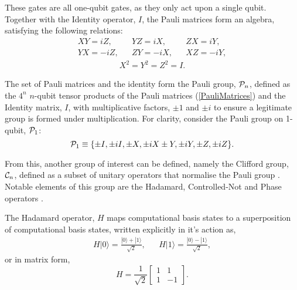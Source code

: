 These gates are all one-qubit gates, as they only act upon a single qubit.
Together with the Identity operator, $I$, the Pauli matrices form an algebra,
satisfying the following relations:
\begin{align}
    XY = iZ,  &  & YZ = iX,  &  & ZX = iY,  \\
    YX = -iZ, &  & ZY = -iX, &  & XZ = -iY,
\end{align}
\begin{align}
    X^2 = Y^2 = Z^2 = I.
\end{align}


The set of Pauli matrices and the identity form
the Pauli group, ${\cal P}_n$, defined as the $4^n$ $n$-qubit tensor products of the Pauli matrices (\ref{PauliMatrices}) and the
Identity matrix, $I$, with multiplicative factors, $\pm 1$ and $\pm i$ to ensure a legitimate group is formed under multiplication.
For clarity, consider the Pauli group on 1-qubit, ${\cal P}_1$:
\begin{equation}\label{PauliGroup}
    {\cal P}_1 \equiv \{ \pm I, \pm iI, \pm X, \pm iX \pm Y, \pm iY, \pm Z, \pm iZ\}.
\end{equation}



From this, another group of interest can be defined, namely the Clifford group, ${\cal C}_n$, defined as a
subset of unitary operators that normalise the Pauli group .
Notable elements of this group are the Hadamard, Controlled-Not and Phase operators \cite{nielsen_chuang_2010}.

The Hadamard operator, $H$ maps computational basis states to a superposition of computational basis states, written explicitly 
in it's action as, 
\begin{align*}
    H|0\rangle = \frac{|0\rangle + |1\rangle}{\sqrt{2}}, && H|1\rangle = \frac{|0\rangle - |1\rangle}{\sqrt{2}},
\end{align*}
or in matrix form, 
\begin{equation}
    H = \frac{1}{\sqrt{2}} \begin{bmatrix}
        1 & 1\\
        1 & -1
    \end{bmatrix}.
\end{equation}

